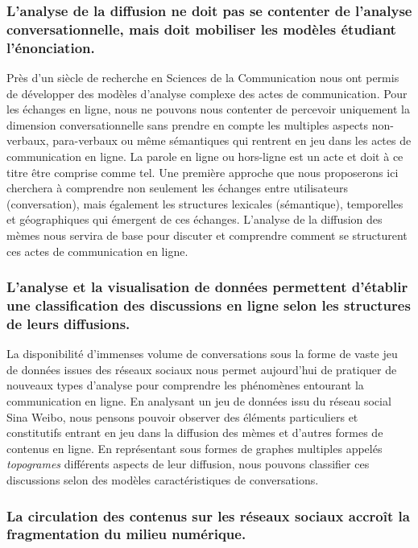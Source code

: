\subsubsection{L'analyse de la diffusion ne doit pas se contenter de l'analyse conversationnelle, mais doit mobiliser les modèles étudiant l'énonciation.}

Près d'un siècle de recherche en Sciences de la Communication nous ont permis de développer des modèles d'analyse complexe des actes de communication. Pour les échanges en ligne, nous ne pouvons nous contenter de percevoir uniquement la dimension conversationnelle sans prendre en compte les multiples aspects non-verbaux, para-verbaux ou même sémantiques qui rentrent en jeu dans les actes de communication en ligne. La parole en ligne ou hors-ligne est un acte et doit à ce titre être comprise comme tel. Une première approche que nous proposerons ici cherchera à comprendre non seulement les échanges entre utilisateurs (conversation), mais également les structures lexicales (sémantique), temporelles et géographiques qui émergent de ces échanges. L'analyse de la diffusion des mèmes nous servira de base pour discuter et comprendre comment se structurent ces actes de communication en ligne.


\subsubsection{L'analyse et la visualisation de données permettent d'établir une classification des discussions en ligne selon les structures de leurs diffusions.}

La disponibilité d'immenses volume de conversations sous la forme de vaste jeu de données issues des réseaux sociaux nous permet aujourd'hui de pratiquer de nouveaux types d'analyse pour comprendre les phénomènes entourant la communication en ligne. En analysant un jeu de données issu du réseau social Sina Weibo, nous pensons pouvoir observer des éléments particuliers et constitutifs entrant en jeu dans la diffusion des mèmes et d'autres formes de contenus en ligne. En représentant sous formes de graphes multiples appelés \textit{topogrames} différents aspects de leur diffusion, nous pouvons classifier ces discussions selon des modèles caractéristiques de conversations.

\subsubsection{La circulation des contenus sur les réseaux sociaux accroît la fragmentation du milieu numérique.}

